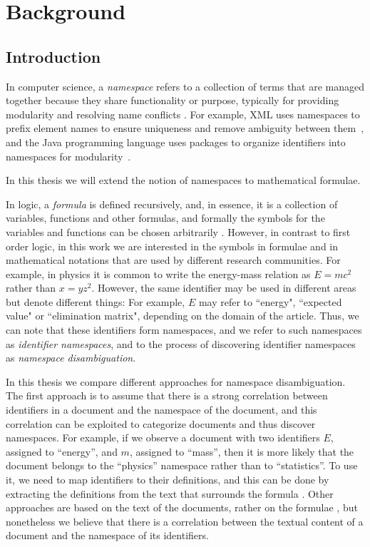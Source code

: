
\section{Background}
\subsection{Introduction}

In computer science, a \emph{namespace} refers to a collection of terms that are managed together because they share functionality or purpose, typically for providing modularity and resolving name conflicts \cite{duval2002metadata}. For example, XML uses namespaces to prefix element names to ensure uniqueness and remove ambiguity between them~\cite{bray1999namespaces}, and the Java programming language uses packages to organize identifiers into namespaces for modularity~\cite{gosling2014java}.

In this thesis we will extend the notion of namespaces to mathematical formulae.


In logic, a \emph{formula} is defined recursively, and, in essence, it is a collection of variables, functions and other formulas, and formally the symbols for the variables and functions can be chosen arbitrarily \cite{barwise2000language}. However, in contrast to first order logic, in this work we are interested in the symbols in formulae and in mathematical notations that are used by different research communities.
For example, in physics it is common to write the energy-mass relation as $E=mc^2$ rather than $x=yz^2$.
However, the same identifier may be used in different areas but denote different things: For example, $E$ may refer to ``energy", ``expected value" or ``elimination matrix", depending on the domain of the article. Thus, we can note that these identifiers form namespaces, and we refer to such namespaces as \emph{identifier namespaces}, and to the process of discovering identifier namespaces as \emph{namespace disambiguation}.



In this thesis we compare different approaches for namespace disambiguation. The first approach is to assume that there is a strong correlation between identifiers in a document and the namespace of the document, and this correlation can be exploited to categorize documents and thus discover namespaces. For example, if we observe a document with two identifiers $E$, assigned to ``energy'', and $m$, assigned to ``mass'', then it is more likely that the document belongs to the ``physics'' namespace rather than to ``statistics''. To use it, we need to map identifiers to their definitions, and this can be done by extracting the definitions from the text that surrounds the formula \cite{pagael2014mlp}. Other approaches are based on the text of the documents, rather on the formulae \cite{sebastiani2002machine}, but nonetheless we believe that there is a correlation between the textual content of a document and the namespace of its identifiers.


